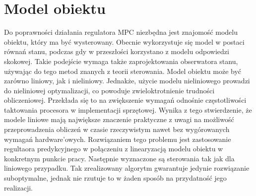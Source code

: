 \section{Model obiektu} \label{sec:model}
Do poprawności działania regulatora MPC niezbędna jest znajomość modelu obiektu, który ma być wysterowany.
Obecnie wykorzystuje się model w postaci równań stanu, podczas gdy w przeszłości korzystano z modelu
odpowiedzi skokowej. Takie podejście wymaga także zaprojektowania obserwatora stanu, używając do tego
metod znanych z teorii sterowania. Model obiektu może być zarówno liniowy, jak i nieliniowy. Jednakże,
użycie modelu nieliniowego prowadzi do nieliniowej optymalizacji, co powoduje zwieloktrotnienie trudności
obliczeniowej. Przekłada się to na zwiększenie wymagań odnośnie częstotliwości taktowania procesora
w implementacji sprzętowej. Wynika z tego stwierdzenie, że modele liniowe mają największe znaczenie
praktyczne z uwagi na możliwość przeprowadzenia obliczeń w czasie rzeczywistym nawet bez wygórowanych
wymagań hardware'owych. Rozwiązaniem tego problemu jest zastosowanie regultaora predykcyjnego w połączeniu
z linearyzacją modelu obiektu w konkretnym punkcie pracy. Następnie wyznaczone są sterowania tak jak dla
liniowego przypadku. Tak zrealizowany algorytm gwarantuje jedynie rozwiązanie suboptymalne, jednak nie
rzutuje to w żaden sposób na przydatność jego realizacji.

